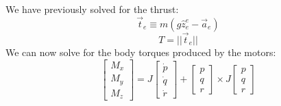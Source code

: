 \documentclass[10pt]{article}
\begin{document}
We have previously solved for the thrust:
%
$$\vec{t}_e \equiv m( g \hat{z}^e_e - \vec{a}_e)$$
%
$$T = ||\vec{t}_e||$$
%
We can now solve for the body torques produced by the motors:
%
$$\begin{bmatrix}M_x \\ M_y \\ M_z \end{bmatrix} = J \begin{bmatrix}
\dot{p} \\ \dot{q} \\ \dot{r}
\end{bmatrix} + \begin{bmatrix}p \\ q \\ r\end{bmatrix} \times J \begin{bmatrix}p \\ q \\ r\end{bmatrix}$$

\end{document}
